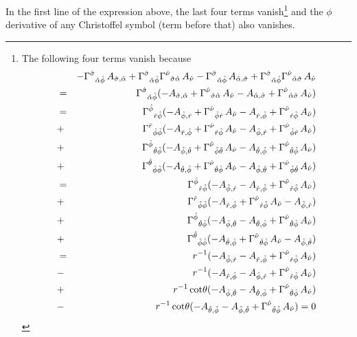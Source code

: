 \documentclass[\mydriver,12pt,twoside,notitlepage,a4paper]{article}
\begin{document}
In the first line of the expression above, the last four terms vanish\footnote{
The following four terms vanish because
\begin{eqnarray}
&&-{\Gamma^{\hat\sigma}}_{\hat\alpha\hat\phi}\,A_{\hat\sigma,\hat\alpha}
+{\Gamma^{\hat\sigma}}_{\hat\alpha\hat\phi}{\Gamma^{\hat\nu}}_{\hat\sigma\hat\alpha}\,A_{\hat\nu}
-{\Gamma^{\hat\sigma}}_{\hat\alpha\hat\phi}\,A_{\hat\alpha,\hat\sigma}
+{\Gamma^{\hat\sigma}}_{\hat\alpha\hat\phi}{\Gamma^{\hat\nu}}_{\hat\alpha\hat\sigma}\,A_{\hat\nu}
\cr
&=&{\Gamma^{\hat\sigma}}_{\hat\alpha\hat\phi}(
-A_{\hat\sigma,\hat\alpha}
+{\Gamma^{\hat\nu}}_{\hat\sigma\hat\alpha}\,A_{\hat\nu}
-A_{\hat\alpha,\hat\sigma}
+{\Gamma^{\hat\nu}}_{\hat\alpha\hat\sigma}\,A_{\hat\nu})
\cr
&=&{\Gamma^{\hat\phi}}_{\hat r\hat\phi}(
-A_{\hat\phi,\hat r}
+{\Gamma^{\hat\nu}}_{\hat\phi\hat r}\,A_{\hat\nu}
-A_{\hat r,\hat\phi}
+{\Gamma^{\hat\nu}}_{\hat r\hat\phi}\,A_{\hat\nu})
\cr
&+&{\Gamma^{\hat r}}_{\hat\phi\hat\phi}(
-A_{\hat r,\hat\phi}
+{\Gamma^{\hat\nu}}_{\hat r\hat\phi}\,A_{\hat\nu}
-A_{\hat\phi,\hat r}
+{\Gamma^{\hat\nu}}_{\hat\phi\hat r}\,A_{\hat\nu})
\cr
&+&{\Gamma^{\hat\phi}}_{\hat\theta\hat\phi}(
-A_{\hat\phi,\hat\theta}
+{\Gamma^{\hat\nu}}_{\hat\phi\hat\theta}\,A_{\hat\nu}
-A_{\hat\theta,\hat\phi}
+{\Gamma^{\hat\nu}}_{\hat\theta\hat\phi}\,A_{\hat\nu})
\cr
&+&{\Gamma^{\hat\theta}}_{\hat\phi\hat\phi}(
-A_{\hat\theta,\hat\phi}
+{\Gamma^{\hat\nu}}_{\hat\theta\hat\phi}\,A_{\hat\nu}
-A_{\hat\phi,\hat\theta}
+{\Gamma^{\hat\nu}}_{\hat\phi\hat\theta}\,A_{\hat\nu})
\cr
&=&{\Gamma^{\hat\phi}}_{\hat r\hat\phi}(
-A_{\hat\phi,\hat r}
-A_{\hat r,\hat\phi}
+{\Gamma^{\hat\nu}}_{\hat r\hat\phi}\,A_{\hat\nu})
\cr
&+&{\Gamma^{\hat r}}_{\hat\phi\hat\phi}(
-A_{\hat r,\hat\phi}
+{\Gamma^{\hat\nu}}_{\hat r\hat\phi}\,A_{\hat\nu}
-A_{\hat\phi,\hat r}
)
\cr
&+&{\Gamma^{\hat\phi}}_{\hat\theta\hat\phi}(
-A_{\hat\phi,\hat\theta}
-A_{\hat\theta,\hat\phi}
+{\Gamma^{\hat\nu}}_{\hat\theta\hat\phi}\,A_{\hat\nu})
\cr
&+&{\Gamma^{\hat\theta}}_{\hat\phi\hat\phi}(
-A_{\hat\theta,\hat\phi}
+{\Gamma^{\hat\nu}}_{\hat\theta\hat\phi}\,A_{\hat\nu}
-A_{\hat\phi,\hat\theta}
)
\cr
&=&r^{-1}(
-A_{\hat\phi,\hat r}
-A_{\hat r,\hat\phi}
+{\Gamma^{\hat\nu}}_{\hat r\hat\phi}\,A_{\hat\nu})
\cr
&-&r^{-1}(
-A_{\hat r,\hat\phi}
-A_{\hat\phi,\hat r}
+{\Gamma^{\hat\nu}}_{\hat r\hat\phi}\,A_{\hat\nu}
)
\cr
&+&r^{-1}\cot\!\theta(
-A_{\hat\phi,\hat\theta}
-A_{\hat\theta,\hat\phi}
+{\Gamma^{\hat\nu}}_{\hat\theta\hat\phi}\,A_{\hat\nu})
\cr
&-&r^{-1}\cot\!\theta(
-A_{\hat\theta,\hat\phi}
-A_{\hat\phi,\hat\theta}
+{\Gamma^{\hat\nu}}_{\hat\theta\hat\phi}\,A_{\hat\nu}
)=0
\end{eqnarray}
} and the $\phi$ derivative of any Christoffel symbol (term before that)
also vanishes.
\end{document}
